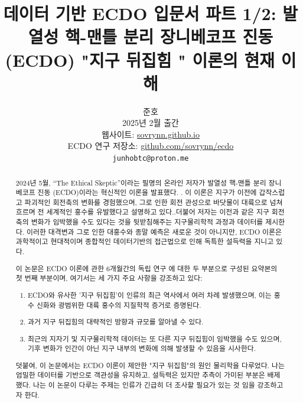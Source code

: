\documentclass[10pt,twocolumn,letterpaper]{article}
\begin{document}
\title{ 데이터 기반 ECDO 입문서 파트 1/2: 발열성 핵-맨틀 분리 장니베코프 진동 (ECDO) "지구 뒤집힘 " 이론의 현재 이해}

\author{준호\\
2025년 2월 출간\\
웹사이트: \href{https://sovrynn.github.io}{sovrynn.github.io}\\
ECDO 연구 저장소: \href{https://github.com/sovrynn/ecdo}{github.com/sovrynn/ecdo}\\
{\tt\small junhobtc@proton.me}
}

\maketitle

\begin{abstract}
2024년 5월, “The Ethical Skeptic”이라는 필명의 온라인 저자가 발열성 핵-맨틀 분리 장니베코프 진동 (ECDO)이라는 혁신적인 이론을 발표했다. \cite{0}. 이 이론은 지구가 이전에 갑작스럽고 파괴적인 회전축의 변화를 경험했으며, 그로 인한 회전 관성으로 바닷물이 대륙으로 넘쳐흐르며 전 세계적인 홍수를 유발했다고 설명하고 있다.\cite{1}.더불어 저자는 이전과 같은 지구 회전축의 변화가 임박했을 수도 있다는 것을 뒷받침해주는 지구물리학적 과정과 데이터를 제시한다. 이러한 대격변과 그로 인한 대홍수와 종말 예측은 새로운 것이 아니지만, ECDO 이론은 과학적이고 현대적이며 종합적인 데이터기반의 접근법으로 인해  독특한 설득력을 지니고 있다. 

이 논문은 ECDO 이론에 관한 6개월간의 독립 연구 \cite{2,20}에 대한 두 부분으로 구성된 요약본의 첫 번째 부분이며, 여기서는 세 가지 주요 사항을 강조하고 있다:

\begin{flushleft}
\begin{enumerate}
    \item ECDO와 유사한 '지구 뒤집힘'이 인류의 최근 역사에서 여러 차례 발생했으며, 이는 홍수 신화와 광범위한 대륙 홍수의 지질학적 증거로 증명된다.
    \item 과거 지구 뒤집힘의 대략적인 방향과 규모를  알아낼 수 있다.
    \item 최근의 지자기 및 지구물리학적 데이터는 또 다른 지구 뒤집힘이 임박했을 수도 있으며, 기후 변화가 인간이 아닌 지구 내부의 변화에 의해 발생할 수 있음을 시사한다.
\end{enumerate}
\end{flushleft}

 덧붙여, 이 논문에서는 ECDO 이론이 제안한 "지구 뒤집힘"의 원인 물리학을 다루었다.
나는 엄밀한 데이터를 기반으로 객관성을 유지하고, 설득력은 있지만 추측이 가미된 부분은 배제했다. 나는 이 논문이 다루는 주제는 인류가 긴급히 더 조사할 필요가 있는 것 임을 강조하고자 한다.
\end{abstract}
\end{document}
